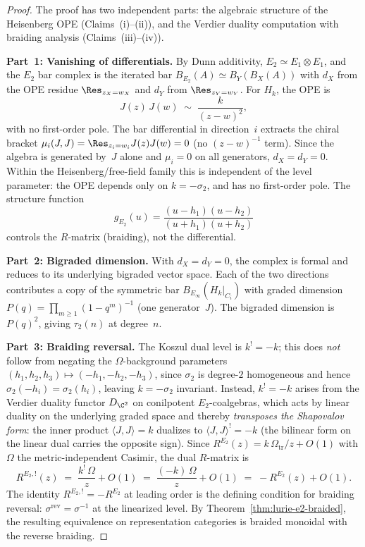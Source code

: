 \begin{proof}
 The proof has two independent parts: the algebraic structure of the
Heisenberg OPE (Claims~(i)--(ii)), and the Verdier duality computation
with braiding analysis (Claims~(iii)--(iv)).

\medskip
\noindent\textbf{Part~1: Vanishing of differentials.}
By Dunn additivity, $E_2 \simeq E_1 \otimes E_1$, and the $E_2$ bar
complex is the iterated bar $B_{E_2}(A) \simeq B_Y(B_X(A))$ with
$d_X$ from the OPE residue $\Res_{z_X = w_X}$ and $d_Y$ from
$\Res_{z_Y = w_Y}$. For $H_k$, the OPE is
\[
 J(z)\,J(w) \;\sim\; \frac{k}{(z-w)^2},
\]
with no first-order pole. The bar differential in direction~$i$
extracts the chiral bracket $\mu_i(J, J) = \Res_{z_i = w_i} J(z) J(w)
= 0$ (no $(z-w)^{-1}$ term). Since the algebra is generated by~$J$
alone and $\mu_i = 0$ on all generators, $d_X = d_Y = 0$. Within the
Heisenberg/free-field family this is independent of the level parameter:
the OPE depends only on $k = -\sigma_2$, and has no first-order pole.
The structure function
\[
 g_{E_2}(u) = \frac{(u - h_1)(u - h_2)}{(u + h_1)(u + h_2)}
\]
controls the $R$-matrix (braiding), not the differential.

\medskip
\noindent\textbf{Part~2: Bigraded dimension.}
With $d_X = d_Y = 0$, the complex is formal and reduces to its
underlying bigraded vector space. Each of the two directions contributes
a copy of the symmetric bar $B_{E_\infty}(H_k|_{C_i})$ with graded
dimension $P(q) = \prod_{m \geq 1} (1-q^m)^{-1}$ (one generator~$J$).
The bigraded dimension is $P(q)^2$, giving $\tau_2(n)$ at degree~$n$.

\medskip
\noindent\textbf{Part~3: Braiding reversal.}
The Koszul dual level is $k^! = -k$; this does \emph{not} follow from
negating the $\Omega$-background parameters $(h_1, h_2, h_3) \mapsto
(-h_1, -h_2, -h_3)$, since $\sigma_2$ is degree-$2$ homogeneous and
hence $\sigma_2(-h_i) = \sigma_2(h_i)$, leaving $k = -\sigma_2$
invariant. Instead, $k^! = -k$ arises from the Verdier duality
functor $D_{\C^2}$ on conilpotent $E_2$-coalgebras, which acts by
linear duality on the underlying graded space and thereby
\emph{transposes the Shapovalov form}: the inner product
$\langle J, J \rangle = k$ dualizes to $\langle J, J \rangle^! = -k$
(the bilinear form on the linear dual carries the opposite sign).
Since $R^{E_2}(z) = k\,\Omega_{\mathrm{tr}}/z + O(1)$ with $\Omega$ the
metric-independent Casimir, the dual $R$-matrix is
\[
 R^{E_2,!}(z) \;=\; \frac{k^!\,\Omega}{z} + O(1)
 \;=\; \frac{(-k)\,\Omega}{z} + O(1)
 \;=\; -R^{E_2}(z) + O(1).
\]
The identity $R^{E_2,!} = -R^{E_2}$ at leading order is the defining
condition for braiding reversal: $\sigma^{\mathrm{rev}} = \sigma^{-1}$
at the linearized level. By Theorem~\ref{thm:lurie-e2-braided}, the
resulting equivalence on representation categories is braided monoidal
with the reverse braiding.


\end{proof}
